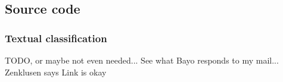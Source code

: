 \subsection{Source code}
\subsubsection{Textual classification}
TODO, or maybe not even needed... See what Bayo responds to my mail... Zenklusen says Link is okay
